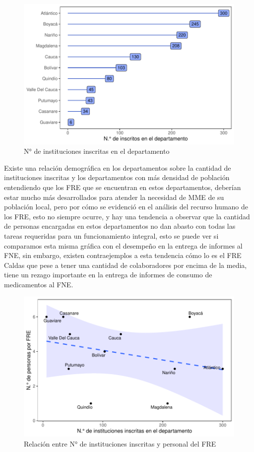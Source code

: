 \documentclass[
]{book}
\begin{document}
\begin{figure}
\includegraphics[width=0.9\linewidth]{InformeFinal_files/figure-latex/institucionesInscritas-1} \caption{N° de instituciones inscritas en el departamento}\label{fig:institucionesInscritas}
\end{figure}

Existe una relación demográfica en los departamentos sobre la cantidad de instituciones inscritas y los departamentos con más densidad de población entendiendo que los FRE que se encuentran en estos departamentos, deberían estar mucho más desarrollados para atender la necesidad de MME de su población local, pero por cómo se evidenció en el análisis del recurso humano de los FRE, esto no siempre ocurre, y hay una tendencia a observar que la cantidad de personas encargadas en estos departamentos no dan abasto con todas las tareas requeridas para un funcionamiento integral, esto se puede ver si comparamos esta misma gráfica con el desempeño en la entrega de informes al FNE, sin embargo, existen contraejemplos a esta tendencia cómo lo es el FRE Caldas que pese a tener una cantidad de colaboradores por encima de la media, tiene un rezago importante en la entrega de informes de consumo de medicamentos al FNE.

\begin{figure}
\includegraphics[width=0.85\linewidth]{InformeFinal_files/figure-latex/institucionesInscritasRelacion-1} \caption{Relación entre N° de instituciones inscritas y personal del FRE}\label{fig:institucionesInscritasRelacion}
\end{figure}
\end{document}
